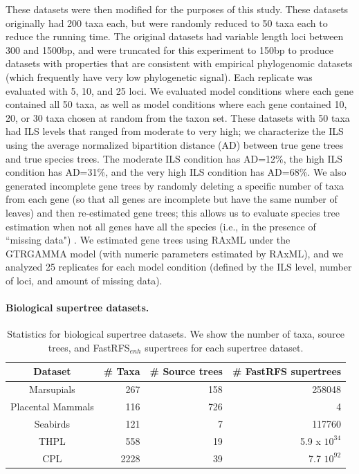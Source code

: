 These datasets were then modified for the purposes of this study. These datasets originally had 200 taxa each, but were randomly reduced to 50 taxa each to reduce the running time. 
The original datasets had variable length loci between 300 and 1500bp, and were truncated for this experiment to 150bp to produce datasets with properties that are consistent with empirical phylogenomic datasets (which frequently have very low phylogenetic signal). 
Each replicate was evaluated with 5, 10, and 25 loci. 
We evaluated model conditions where each gene contained all 50 taxa, as well as model conditions where each gene contained 10, 20, or 30 taxa chosen at random from the taxon set.
These datasets with 50 taxa had ILS levels that ranged from moderate to very high;  we characterize the ILS using the average normalized bipartition distance (AD) between true gene trees and true species trees.
The moderate ILS condition has AD=12\%, the high ILS condition has AD=31\%, and the very high ILS condition has AD=68\%.
We also generated incomplete gene trees by randomly deleting a specific number of taxa from each gene (so that all genes are incomplete but have the same number of leaves) and then re-estimated gene trees; this allows us to evaluate species tree estimation when not all genes have all the species (i.e., in the presence of ``missing data") \cite{MolloyWarnow2017}. 
We estimated gene trees  using RAxML \cite{Stamatakis2014} under the GTRGAMMA model (with numeric parameters estimated by RAxML), and we analyzed 25 replicates for each model condition (defined by the ILS level, number of loci, and amount of missing data).


\paragraph{Biological supertree datasets. }



  \begin{table}
  \centering 
   \begin{tabular}{|c|r|r|r|}
     \hline
     Dataset & \# Taxa & \# Source trees  &  \# FastRFS supertrees \\
     \hline
     Marsupials \cite{marsupial} & 267 & 158 & 258048 \\
     Placental Mammals \cite{placental} & 116 & 726  &  4\\
     Seabirds \cite{kennedy2002seabird} & 121 & 7 & 117760\\
     THPL \cite{THPL}& 558 & 19  &  5.9 x  $10^{34}$\\
     CPL \cite{cpl}& 2228 & 39   & 7.7 $10^{92}$  \\
     \hline
   \end{tabular}
   
  \caption[Statistics for biological supertree datasets for SIESTA study]{Statistics for biological supertree datasets. We show the number of taxa, source trees, and FastRFS$_{enh}$ supertrees for each supertree dataset. }
  \label{siesta::table:bio-supertree}
  \end{table}



